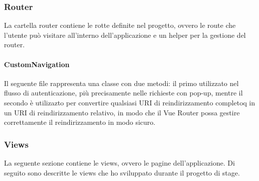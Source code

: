 \subsubsection{Router}\label{subsubsec:router}
La cartella router contiene le rotte definite nel progetto, ovvero le route che l'utente può visitare all'interno dell'applicazione e un helper per la gestione del router.
\paragraph{CustomNavigation}\label{par:custom-navigation}
Il seguente file rappresenta una classe con due metodi: il primo utilizzato nel flusso di autenticazione, più precisamente nelle richieste con pop-up,
mentre il secondo è utilizazto per convertire qualsiasi URI di reindirizzamento completoq in un URI di reindirizzamento relativo, in modo che il Vue Router
possa gestire correttamente il reindirizzamento in modo sicuro.

\subsubsection{Views}\label{subsubsec:views}
La seguente sezione contiene le views, ovvero le pagine dell'applicazione.
Di seguito sono descritte le views che ho sviluppato durante il progetto di stage.

